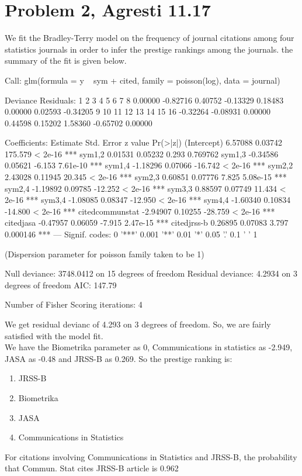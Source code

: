\documentclass{article}
\begin{document}
\section{Problem 2, Agresti 11.17}
We fit the Bradley-Terry model on the frequency of journal citations among four statistics journals in order to infer the prestige rankings among the journals. the summary of the fit is given below.
\begin{Schunk}
\begin{Soutput}
Call:
glm(formula = y ~ sym + cited, family = poisson(log), data = journal)

Deviance Residuals: 
       1         2         3         4         5         6         7         8  
 0.00000  -0.82716   0.40752  -0.13329   0.18483   0.00000   0.02593  -0.34205  
       9        10        11        12        13        14        15        16  
-0.32264  -0.08931   0.00000   0.44598   0.15202   1.58360  -0.65702   0.00000  

Coefficients:
                Estimate Std. Error z value Pr(>|z|)    
(Intercept)      6.57088    0.03742 175.579  < 2e-16 ***
sym1,2           0.01531    0.05232   0.293 0.769762    
sym1,3          -0.34586    0.05621  -6.153 7.61e-10 ***
sym1,4          -1.18296    0.07066 -16.742  < 2e-16 ***
sym2,2           2.43028    0.11945  20.345  < 2e-16 ***
sym2,3           0.60851    0.07776   7.825 5.08e-15 ***
sym2,4          -1.19892    0.09785 -12.252  < 2e-16 ***
sym3,3           0.88597    0.07749  11.434  < 2e-16 ***
sym3,4          -1.08085    0.08347 -12.950  < 2e-16 ***
sym4,4          -1.60340    0.10834 -14.800  < 2e-16 ***
citedcommunstat -2.94907    0.10255 -28.759  < 2e-16 ***
citedjasa       -0.47957    0.06059  -7.915 2.47e-15 ***
citedjrss-b      0.26895    0.07083   3.797 0.000146 ***
---
Signif. codes:  0 '***' 0.001 '**' 0.01 '*' 0.05 '.' 0.1 ' ' 1

(Dispersion parameter for poisson family taken to be 1)

    Null deviance: 3748.0412  on 15  degrees of freedom
Residual deviance:    4.2934  on  3  degrees of freedom
AIC: 147.79

Number of Fisher Scoring iterations: 4
\end{Soutput}
\end{Schunk}
We get residual devianc of 4.293 on 3 degrees of freedom. So, we are fairly satisfied with the model fit.\\
We have the Biometrika parameter as 0, Communications in statistics as -2.949, JASA as -0.48 and JRSS-B as 0.269. So the prestige ranking is:
\begin{enumerate}
\item{JRSS-B} \item{Biometrika} \item{JASA} \item{Communications in Statistics}
\end{enumerate}
For citations involving Communications in Statistics and JRSS-B, the probability that Commun. Stat cites JRSS-B article is 0.962
\end{document}
